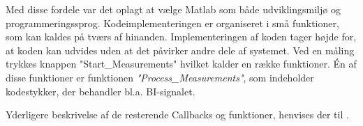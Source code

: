 Med disse fordele var det oplagt at vælge Matlab som både udviklingsmiljø og programmeringssprog.  
Kodeimplementeringen er organiseret i små funktioner, som kan kaldes på tværs af hinanden. Implementeringen af koden tager højde for, at koden kan udvides uden at det påvirker andre dele af systemet. Ved en måling trykkes knappen "Start\_Measurements" hvilket kalder en række funktioner. Én af disse funktioner er funktionen \textit{"Process\_Measurements"}, som indeholder kodestykker, der behandler bl.a. BI-signalet.

%





Yderligere beskrivelse af de resterende Callbacks og funktioner, henvises der til . 
